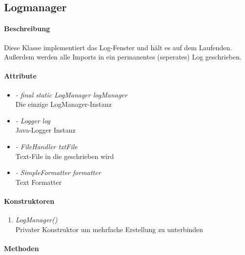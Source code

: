 \subsection{Logmanager}

\paragraph{Beschreibung}
Diese Klasse implementiert das Log-Fenster und hält es auf dem Laufenden.
Außerdem werden alle Imports in ein permanentes (seperates) Log geschrieben.


\paragraph{Attribute}

\begin{itemize}
	
\item \textit{- final static LogManager logManager}  
\\ Die einzige LogManager-Instanz 
\item \textit{- Logger log}
\\ Java-Logger Instanz
\item \textit{- FileHandler txtFile}
\\ Text-File in die geschrieben wird
\item \textit{-  SimpleFormatter formatter}
\\ Text Formatter

\end{itemize}

\paragraph{Konstruktoren}
\begin{enumerate}[-]
	\item \textit{LogManager()} \\
	Privater Konstruktor um mehrfache Erstellung zu unterbinden
\end{enumerate}


\paragraph{Methoden}

